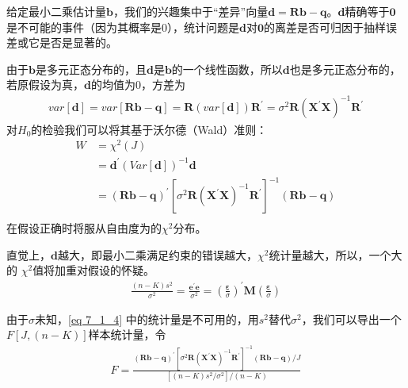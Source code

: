 	给定最小二乘估计量$ \boldsymbol{b} $，我们的兴趣集中于“差异”向量$ \boldsymbol{d} = \boldsymbol{Rb}-\boldsymbol{q} $。$ \boldsymbol{d} $精确等于$ \boldsymbol{0} $是不可能的事件（因为其概率是0），统计问题是$ \boldsymbol{d} $对$ \boldsymbol{0} $的离差是否可归因于抽样误差或它是否是显著的。
	
	由于$ \boldsymbol{b} $是多元正态分布的，且$ \boldsymbol{d} $是$ \boldsymbol{b} $的一个线性函数，所以$ \boldsymbol{d} $也是多元正态分布的，若原假设为真，$ \boldsymbol{d} $的均值为0，方差为
	\begin{align}
	var\left [ \boldsymbol{d} \right ] = var\left [ \boldsymbol{Rb-q} \right ] = \boldsymbol{R}\left ( var\left [ \boldsymbol{d} \right ]  \right )
	\boldsymbol{R}^{\prime} = \sigma^{2}\boldsymbol{R}\left ( \boldsymbol{X}^{\prime}\boldsymbol{X} \right )^{-1}\boldsymbol{R}^{\prime} 
	\end{align}
	对$ H_{0} $的检验我们可以将其基于沃尔德（Wald）准则： 
	\begin{equation}
		\begin{aligned}
			W & = \chi^{2}\left ( J \right ) \\
	      	  & = \boldsymbol{d}^{\prime}\left(Var\left [ \boldsymbol{d} \right] \right )
		      ^{-1} \boldsymbol{d} \\
		  	  & = \left ( \boldsymbol{Rb}-\boldsymbol{q} \right )^{\prime}\left [ \sigma^{2}
		      \boldsymbol{R} \left ( \boldsymbol{X}^{\prime}\boldsymbol{X} \right )^{-1}
		      \boldsymbol{R}^{\prime} \right ]^{-1}\left ( \boldsymbol{Rb}-\boldsymbol{q} \right ) \\
		\end{aligned}
		\label{eq 7_1_4}
	\end{equation}
	在假设正确时将服从自由度为的$ \chi^{2} $分布。
	
	直觉上，$ \boldsymbol{d} $越大，即最小二乘满足约束的错误越大，$ \chi^{2} $统计量越大，所以，一个大的
	$ \chi^{2} $值将加重对假设的怀疑。
	\begin{align}
		\frac{(n-K)s^{2}}{\sigma^{2}} = \frac{\boldsymbol{e}^{\prime} \boldsymbol{e}}{\sigma^{2}} = \left(\frac{\boldsymbol{\varepsilon}}
		{\sigma}\right)^{\prime} \boldsymbol{M}\left(\frac{\boldsymbol{\varepsilon}}
		{\sigma}\right)
		\label{eq 7_1_5} 
	\end{align}

	由于$ \sigma $未知，\ref{eq 7_1_4} 中的统计量是不可用的，用$ s^{2} $替代$ \sigma^{2} $，我们可以导出一个$ F\left [ J,\left ( n - K \right )  \right ] $样本统计量，令
	\begin{align}
		F=\frac{(\boldsymbol{R b}-\boldsymbol{q})^{\prime}\left[\sigma^{2} \boldsymbol{R}\left(\boldsymbol{X^{\prime} X}\right)^{-1} \boldsymbol{R}^{\prime}\right]^{-1}(\boldsymbol{R b}-\boldsymbol{q}) / J}{\left[(n-K) s^{2} / \sigma^{2}\right] /(n-K)}
		\label{eq 7_1_6} 
	\end{align}

